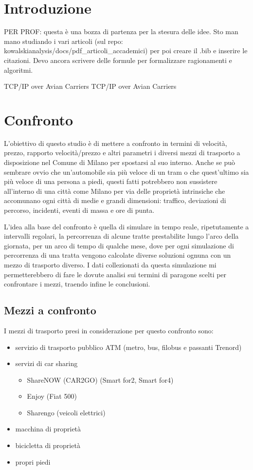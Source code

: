 \documentclass[a4paper]{report}
\begin{document}
	\tableofcontents
	
	\chapter{Introduzione}
	{\LARGE
		PER PROF: questa è una bozza di partenza per la stesura delle idee. Sto man mano studiando i vari articoli (sul repo: kowalskianalysis/docs/pdf\_articoli\_accademici) per poi creare il .bib e inserire le citazioni. Devo ancora scrivere delle formule per formalizzare ragionamenti e algoritmi.
	}
	\linebreak


	TCP/IP over Avian Carriers\cite{waitzman1990standard}
	TCP/IP over Avian Carriers\cite{waitzman1990standard}
	
	\chapter{Confronto}
	{\large
		L'obiettivo di questo studio è di mettere a confronto in termini di velocità, prezzo, rapporto velocità/prezzo e altri parametri i diversi mezzi di trasporto a disposizione nel Comune di Milano per spostarsi al suo interno. Anche se può sembrare ovvio che un'automobile sia più veloce di un tram o che quest'ultimo sia più veloce di una persona a piedi, questi fatti potrebbero non sussistere all'interno di una città come Milano per via delle proprietà intrinsiche che accomunano ogni città di medie e grandi dimensioni: traffico, deviazioni di percorso, incidenti, eventi di massa e ore di punta.
	}

	{\large
		L'idea alla base del confronto è quella di simulare in tempo reale, ripetutamente a intervalli regolari, la percorrenza di alcune tratte prestabilite lungo l'arco della giornata, per un arco di tempo di qualche mese, dove per ogni simulazione di percorrenza di una tratta vengono calcolate diverse soluzioni ognuna con un mezzo di trasporto diverso. I dati collezionati da questa simulazione mi permetterebbero di fare le dovute analisi sui termini di paragone scelti per confrontare i mezzi, traendo infine le conclusioni.
	}

	\section{Mezzi a confronto}
	{\large
		I mezzi di trasporto presi in considerazione per questo confronto sono:
		\begin{itemize}
			\item servizio di trasporto pubblico ATM (metro, bus, filobus e passanti Trenord)
			\item servizi di car sharing
			\begin{itemize}
				\item ShareNOW (CAR2GO) (Smart for2, Smart for4)
				\item Enjoy (Fiat 500)
				\item Sharengo (veicoli elettrici)
			\end{itemize}
			\item macchina di proprietà
			\item bicicletta di proprietà
			\item propri piedi
		\end{itemize}
	}
	
\end{document}
